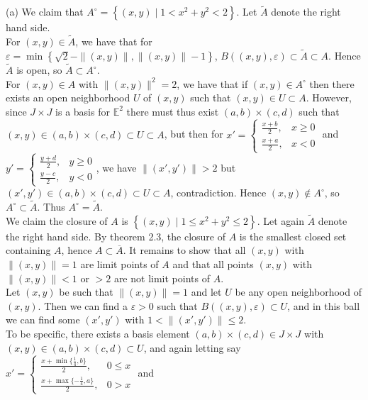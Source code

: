 \documentclass[a4paper]{article}
\begin{document}
    (a) We claim that $A^{\circ} = \left\{ (x,y)  \mid 1 < x^2 + y^2
    < 2 \right\} $. Let $\tilde{A}$ denote the right hand side.\\
    For $(x,y) \in \tilde{A}$, we have that for
    $\varepsilon = \min \left\{ \sqrt{2} - \|(x,y) \|, \|(x,y) \|-1 \right\} $, 
    $B((x,y), \varepsilon) \subset \tilde{A} \subset A$. Hence
    $\tilde{A}$ is open, so $\tilde{A} \subset A^{\circ}$.\\
    For $(x,y) \in A$ with $\|(x,y)\|^2 = 2$, we have that if $(x,y) \in
    A^{\circ}$ then there exists an open neighborhood $U$ of $(x,y)$ such that
    $(x,y) \in U \subset A$. However, since $J \times J$ is a basis for
    $\mathbb{E}^2$ there must thus exist $(a,b) \times (c,d)$ such that
    $(x,y) \in (a,b) \times (c,d) \subset U \subset A$, but then
    for $x' = \begin{cases}
        \frac{x+b}{2}, & x \ge 0\\
        \frac{x+a}{2}, & x<0
    \end{cases}$ and $y' = \begin{cases}
        \frac{y + d}{2}, & y \ge 0\\
        \frac{y-c}{2},& y<0
    \end{cases}$, we have
    $\| (x',y')\| > 2$ but $(x',y') \in (a,b) \times (c,d) \subset U \subset
    A$, contradiction. Hence $(x,y) \not\in A^{\circ}$, so
    $A^{\circ} \subset \tilde{A}$. Thus $A^{\circ} = \tilde{A}$.\\
    \linebreak
    We claim the closure of $A$ is $\left\{ (x,y)  \mid 1 \le x^2 + y^2 \le
    2 \right\} $.
    Let again $\tilde{A}$ denote the right hand side. By theorem 2.3, the
    closure of $A$ is the smallest closed set containing $A$, hence
    $A \subset \overline{A}$. It remains to show that
    all $(x,y)$ with $\|(x,y)\| = 1$ are limit points of $A$ and that
    all points $(x,y)$ with $\|(x,y)\|<1$ or $>2$ are not limit points of
    $A$.\\
    \linebreak
    Let $(x,y)$ be such that $\|(x,y)\| = 1$ and let $U$ be any open
    neighborhood of $(x,y)$. Then we can find a $\varepsilon > 0$ such that
    $B((x,y), \varepsilon) \subset U$, and in this ball we can find some
    $(x',y')$ with $1 < \|(x',y')\| \le 2$.\\
    To be specific, there exists a basis element
    $(a,b) \times (c,d) \in J\times J$ with
    $(x,y) \in (a,b) \times (c,d) \subset U$, and again letting say
    $x' = \begin{cases}
        \frac{x + \min\{\frac{1}{4}, b \}}{2} , & 0 \le x\\
        \frac{x + \max\{-\frac{1}{4},a\}}{2}  , & 0> x
    \end{cases}$ and
\end{document}
